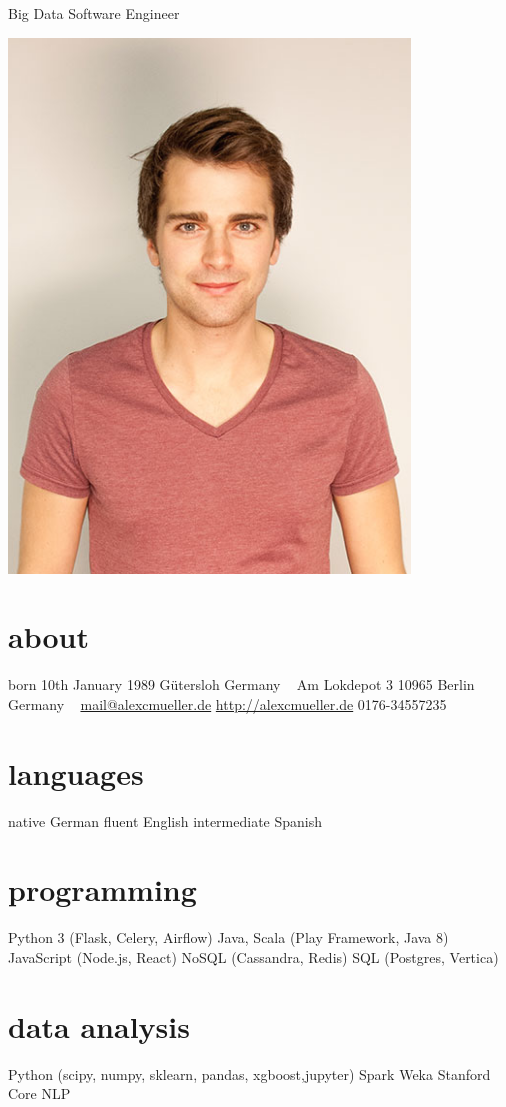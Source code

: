 \documentclass[a4paper]{friggeri-cv}
\begin{document}
       {Big Data Software Engineer}
\begin{aside}
 \includegraphics[width=0.8\textwidth]{portraitme.png} 
  \section{about}
  	born 10th January 1989
  	Gütersloh Germany
  	~
   	Am Lokdepot 3
    10965 Berlin
    Germany
    ~
    \href{mailto:mail@alexcmueller.de}{mail@alexcmueller.de}
    \href{http://alexcmueller.de}{http://alexcmueller.de}
    0176-34557235
  \section{languages}
    native German
    fluent English
    intermediate Spanish
  \section{programming}
    Python 3
    (Flask, Celery, Airflow)
    Java, Scala
    (Play Framework, Java 8)
    JavaScript
    (Node.js, React)
    NoSQL
    (Cassandra, Redis)
    SQL
    (Postgres, Vertica)
    \section{data analysis}
   	Python (scipy, numpy, sklearn, pandas, xgboost,jupyter)
   	Spark
   	Weka
   	Stanford Core NLP
\end{aside}
\end{document}
